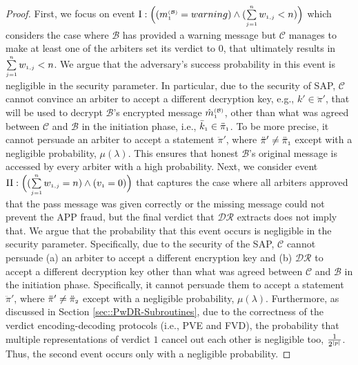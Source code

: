 \begin{proof}
 First, we focus on event $\text{\MakeUppercase{\romannumeral 1}}: \Big((m^{\st\mathcal{(B)}}_{\st1} = warning) \wedge (\sum\limits_{\st j=1}^{\st n} w_{\st 1,j}< {n})\Big)$ which considers the case where $\mathcal{B}$ has provided a warning message but $\mathcal{C}$ manages to make at least one of the arbiters  set its verdict to $0$, that ultimately results in $\sum\limits_{\scriptscriptstyle j=1}^{\scriptscriptstyle n}w_{\scriptscriptstyle 1,j}< {n}$. We argue that the adversary's success probability in this event is negligible  in the security parameter. In particular, due to the security of SAP, $\mathcal{C}$ cannot convince an arbiter to accept a different decryption key, e.g., $k'\in \ddot\pi'$, that will be used to decrypt $\mathcal{B}$'s encrypted message $\hat {m}^{\scriptscriptstyle(\mathcal {B})}_{\scriptscriptstyle 1}$, other than what was agreed between $\mathcal{C}$ and $\mathcal{B}$ in the initiation phase, i.e., $\bar k_{\scriptscriptstyle 1}\in \ddot \pi_{\scriptscriptstyle 1}$.  To be more precise, it cannot persuade an arbiter to accept a statement $\ddot \pi'$, where $\ddot \pi'\neq \ddot \pi_{\scriptscriptstyle 1}$ except with a negligible probability, $\mu(\lambda)$. This ensures that  honest $\mathcal{B}$’s original message is accessed by every arbiter with a high probability. Next, we consider event  $\text{\MakeUppercase{\romannumeral 2}}:\Big((\sum\limits_{\st j=1}^{\st n}w_{\st 1,j}={n}) \wedge ( {v}_{\st 1}=0)\Big)$ that captures the case where all arbiters approved that the pass message was given correctly or the missing message could not prevent the APP fraud, but the final verdict that $\mathcal{DR}$ extracts does not imply that. We argue that the probability that this event occurs is negligible in the security parameter. Specifically, due to the security of the SAP,  $\mathcal{C}$ cannot persuade (a)  an arbiter to accept a different encryption key and (b) $\mathcal{DR}$ to accept a different decryption key other than what was agreed between $\mathcal{C}$ and $\mathcal{B}$ in the initiation phase. Specifically, it cannot persuade them to accept a statement $\ddot \pi'$, where $\ddot \pi'\neq \ddot \pi_{\scriptscriptstyle 2}$ except with a negligible probability, $\mu(\lambda)$. Furthermore, as discussed in Section \ref{sec::PwDR-Subroutines}, due to the correctness of the verdict encoding-decoding protocols (i.e., PVE and FVD), the probability that multiple representations of verdict  $1$ cancel out each other is negligible too, $\frac{1}{2^{\scriptscriptstyle |p|}}$. Thus, the second event occurs only with a negligible probability. 
 

\end{proof}
